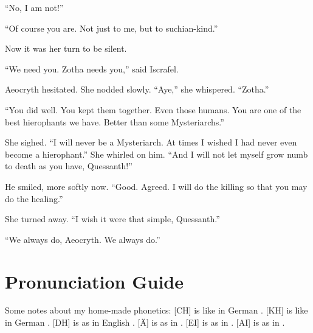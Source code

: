 \documentclass
  [a4paper,
   12pt,
   oneside
  ]%
  {article}
\begin{document}
``No, I am not!''

``Of course you are. Not just to me, but to suchian-kind.''

Now it was her turn to be silent. 

``We need you. Zotha needs you,'' said Iscrafel.

Aeocryth hesitated. She nodded slowly. ``Aye,'' she whispered. ``Zotha.''

``You did well. You kept them together. Even those humans. You are one of the best hierophants we have. Better than some Mysteriarchs.''

She sighed. 
``I will never be a Mysteriarch. At times I wished I had never even become a hierophant.'' 
She whirled on him. 
``And I will not let myself grow numb to death as you have, Quessanth!'' 

He smiled, more softly now. ``Good. Agreed. I will do the killing so that you may do the healing.''

She turned away. ``I wish it were that simple, Quessanth.''

``We always do, Aeocryth. We always do.''








\newpage
\appendix
\section{Pronunciation Guide}
Some notes about my home-made phonetics: 
[CH] is like in German . 
[KH] is like in German . 
[DH] is as in English . 
[Ä] is as in .
[EI] is as in .
[AI] is as in .    

\begin{pronunciationenvironment}{
}
\end{pronunciationenvironment}
\end{document}
